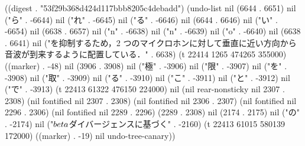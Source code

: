 
((digest . "53f29b368d424d117bbb8205c4debadd") (undo-list nil (6644 . 6651) nil ("ら" . -6644) nil ("れ" . -6645) nil ("る" . -6646) nil (6644 . 6646) nil ("い" . -6654) nil (6638 . 6657) nil ("n" . -6638) nil ("n" . -6639) nil ("o" . -6640) nil (6638 . 6641) nil ("を抑制するため，2 つのマイクロホンに対して垂直に近い方向から音波が到来するように配置している．" . 6638) (t 22414 1265 474265 355000) ((marker) . -48) nil (3906 . 3908) nil ("極" . -3906) nil ("限" . -3907) nil ("を" . -3908) nil ("取" . -3909) nil ("る" . -3910) nil ("こ" . -3911) nil ("と" . -3912) nil ("で" . -3913) (t 22413 61322 476150 224000) nil (nil rear-nonsticky nil 2307 . 2308) (nil fontified nil 2307 . 2308) (nil fontified nil 2306 . 2307) (nil fontified nil 2296 . 2306) (nil fontified nil 2289 . 2296) (2289 . 2308) nil (2174 . 2175) nil ("の" . -2174) nil ("$\\beta$ダイバージェンスに基づく" . -2160) (t 22413 61015 580139 172000) ((marker) . -19) nil undo-tree-canary))
